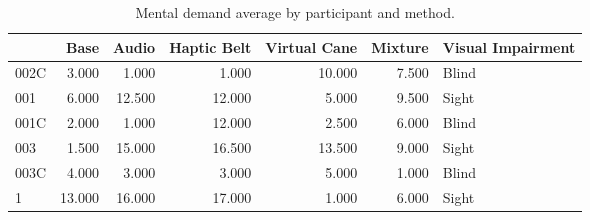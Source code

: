 
\begin{table}[!htb]
\centering
\caption{Mental demand average by participant and method.}
\label{tab:md_average}
\begin{tabular}{lrrrrrl}
\toprule
{} &   Base &  Audio &  Haptic Belt &  Virtual Cane &  Mixture & Visual Impairment \\
\midrule
002C &  3.000 &  1.000 &        1.000 &        10.000 &    7.500 &             Blind \\
001  &  6.000 & 12.500 &       12.000 &         5.000 &    9.500 &             Sight \\
001C &  2.000 &  1.000 &       12.000 &         2.500 &    6.000 &             Blind \\
003  &  1.500 & 15.000 &       16.500 &        13.500 &    9.000 &             Sight \\
003C &  4.000 &  3.000 &        3.000 &         5.000 &    1.000 &             Blind \\
1    & 13.000 & 16.000 &       17.000 &         1.000 &    6.000 &             Sight \\
\bottomrule
\end{tabular}
\end{table}

